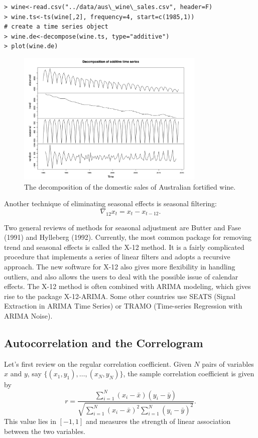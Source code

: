 \begin{verbatim}
> wine<-read.csv("../data/aus\_wine\_sales.csv", header=F)
> wine.ts<-ts(wine[,2], frequency=4, start=c(1985,1))
# create a time series object
> wine.de<-decompose(wine.ts, type="additive")
> plot(wine.de)
\end{verbatim}

\begin{figure}[ht]
	\centering
	\includegraphics[width=0.8\textwidth]{Chapter 2/fig2-3.png}
	\caption{The decomposition of the domestic sales of Australian fortified wine.}
	\label{fig:2.3}
\end{figure}

Another technique of eliminating seasonal effects is seasonal filtering:
\[ \nabla_{12}x_t = x_t - x_{t-12}. \]

Two general reviews of methods for seasonal adjustment are Butter and Fase (1991) and Hylleberg (1992). Currently, the most common package for removing trend and seasonal effects is called the X-12 method. It is a fairly complicated procedure that implements a series of linear filters and adopts a recursive approach. The new software for X-12 also gives more flexibility in handling outliers, and also allows the users to deal with the possible issue of calendar effects. The X-12 method is often combined with ARIMA modeling, which gives rise to the package X-12-ARIMA. Some other countries use SEATS (Signal Extraction in ARIMA Time Series) or TRAMO (Time-series Regression with ARIMA Noise).



\subsection{Autocorrelation and the Correlogram}
Let's first review on the regular correlation coefficient. Given $N$ pairs of variables $x$ and $y$, say $\{ (x_1,y_1), \dots, (x_N,y_N) \}$, the sample correlation coefficient is given by 
\[ r = \frac{\sum_{i = 1}^{N} (x_i - \bar{x})(y_i - \bar{y})}{\sqrt{\sum_{i = 1}^{N} (x_i - \bar{x})^2 
\sum_{i = 1}^{N} (y_i - \bar{y})^2}}. \]
This value lies in $[-1, 1]$ and measures the strength of linear association between the two variables. 

